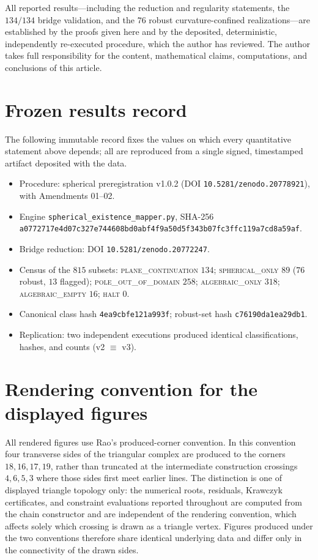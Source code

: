 \documentclass[pdflatex,sn-mathphys-num]{sn-jnl}
\theoremstyle{thmstyleone}%
\theoremstyle{thmstyletwo}%
\theoremstyle{thmstylethree}%
\begin{document}
All reported results---including the reduction and regularity statements, the $134/134$ bridge validation, and the $76$ robust curvature-confined realizations---are established by the proofs given here and by the deposited, deterministic, independently re-executed procedure, which the author has reviewed. The author takes full responsibility for the content, mathematical claims, computations, and conclusions of this article.

\begin{appendices}

\section{Frozen results record}
\label{app:frozen}
The following immutable record fixes the values on which every quantitative
statement above depends; all are reproduced from a single signed, timestamped
artifact deposited with the data.

\begin{itemize}
\itemsep2pt
\item Procedure: spherical preregistration v1.0.2 (DOI \texttt{10.5281/zenodo.20778921}), with Amendments 01--02.
\item Engine \texttt{spherical\_existence\_mapper.py}, SHA-256\\
\texttt{a0772717e4d07c327e744608bd0abf4f9a50d5f343b07fc3ffc119a7cd8a59af}.
\item Bridge reduction: DOI \texttt{10.5281/zenodo.20772247}.
\item Census of the $815$ subsets:
  \textsc{plane\_continuation} $134$;
  \textsc{spherical\_only} $89$ ($76$ robust, $13$ flagged);
  \textsc{pole\_out\_of\_domain} $258$;
  \textsc{algebraic\_only} $318$;
  \textsc{algebraic\_empty} $16$;
  \textsc{halt} $0$.
\item Canonical class hash \texttt{4ea9cbfe121a993f}; robust-set hash \texttt{c76190da1ea29db1}.
\item Replication: two independent executions produced identical classifications, hashes, and counts (v2 $\equiv$ v3).
\end{itemize}

\section{Rendering convention for the displayed figures}
\label{app:topology}
All rendered figures use Rao's produced-corner convention. In this convention four transverse sides of the triangular complex are produced to the corners $18,16,17,19$, rather than truncated at the intermediate construction crossings $4,6,5,3$ where those sides first meet earlier lines. The distinction is one of displayed triangle topology only: the numerical roots, residuals, Krawczyk certificates, and constraint evaluations reported throughout are computed from the chain constructor and are independent of the rendering convention, which affects solely which crossing is drawn as a triangle vertex. Figures produced under the two conventions therefore share identical underlying data and differ only in the connectivity of the drawn sides.

\end{appendices}
\end{document}
